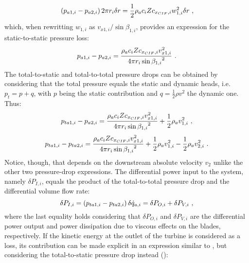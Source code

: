 \begin{equation}{\label{eq:momentum_balance_x-axis}}
\left(p_{a1,i} - p_{a2,i}\right)2\pi{r_{i}}\delta{r} = \frac{1}{2}\rho_{a}c_{i}Zc_{x_{CIF},i}w_{1,i}^{2}\delta{r} \ ,
\end{equation}
which, when rewritting $w_{1,i}$ as $v_{x1,i}/\sin{\beta_{1,i}}$, provides an expression for the static-to-static pressure loss:
\begin{equation}{\label{eq:static-to-static_pressure_drop}}
	p_{a1,i}-p_{a2,i} = \frac{\rho_{a}c_{i}Zc_{x_{CIF},i}v_{x1,i}^{2}}{4\pi{r_{i}}\sin{\beta_{1,i}}^{2}} \ .
\end{equation}
The total-to-static and total-to-total pressure drops can be obtained by considering that the total pressure equals the static and dynamic heads, i.e. $p_{t} = p + q$, with $p$ being the static contribution and $q=\frac{1}{2}\rho{v^{2}}$ the dynamic one. Thus:
\begin{equation}{\label{eq:total-to-static_pressure_drop}}
	p_{ta1,i} - p_{a2,i} = \frac{\rho_{a}c_{i}Zc_{x_{CIF},i}v_{x1,i}^{2}}{4\pi{r_{i}}\sin{\beta_{1,i}}^{2}} + \frac{1}{2}\rho_{a}v_{1,i}^{2} \ ,
\end{equation}
\begin{equation}{\label{eq:total-to-total_pressure_drop}}
	p_{ta1,i} - p_{ta2,i} = \frac{\rho_{a}c_{i}Zc_{x_{CIF},i}v_{x1,i}^{2}}{4\pi{r_{i}}\sin{\beta_{1,i}}^{2}} + \frac{1}{2}\rho_{a}v_{1,i}^{2} - \frac{1}{2}\rho_{a}v_{2,i}^{2} \ .
\end{equation}
Notice, though, that  depends on the downstream absolute velocity $v_{2}$ unlike the other two pressure-drop expressions. The differential power input to the system, namely $\delta{P_{I,i}}$, equals the product of the total-to-total pressure drop and the differential volume flow rate:
\begin{equation}{\label{eq:differential_power_input}}
	\delta{P_{I,i}} = \left(p_{ta1,i} - p_{ta2,i}\right)\delta\dot{q}_{a,i}=\delta{P_{O,i}} + \delta{P_{V,i}} \ ,
\end{equation}
where the last equality holds considering that $\delta{P_{O,i}}$ and $\delta{P_{V,i}}$ are the differential power output and power dissipation due to viscous effects on the blades, respectively. If the kinetic energy at the outlet of the turbine is considered as a loss, its contribution can be made explicit in an expression similar to , but considering the total-to-static pressure drop instead ():
